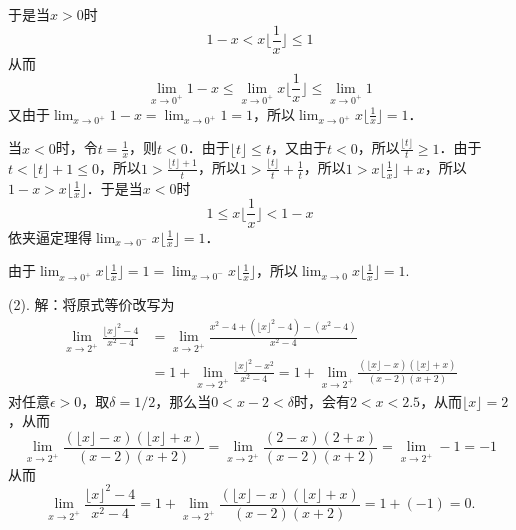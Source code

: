 于是当$x > 0$时
\begin{equation}
    1-x < x \bigg\lfloor \frac{1}{x} \bigg\rfloor \leq 1
\end{equation}
从而
\begin{equation}
    \lim_{x \to 0^+} 1 - x \leq \lim_{x \to 0^+} x \bigg\lfloor \frac{1}{x} \bigg\rfloor \leq \lim_{x \to 0^+} 1
\end{equation}
又由于$\displaystyle\lim_{x \to 0^+} 1-x = \displaystyle\lim_{x \to 0^+} 1 = 1$，所以$\displaystyle\lim_{x \to 0^+} x \bigg\lfloor \displaystyle\frac{1}{x} \bigg\rfloor = 1$．

当$x < 0$时，令$t = \displaystyle\frac{1}{x}$，则$t < 0$．由于$\lfloor t \rfloor \leq t$，又由于$t<0$，所以$\displaystyle\frac{\lfloor t \rfloor}{t} \geq 1$．由于$t < \lfloor t \rfloor + 1 \leq 0$，所以$1 > \displaystyle\frac{\lfloor t \rfloor + 1}{t}$，所以$1 > \displaystyle\frac{\lfloor t \rfloor}{t} + \displaystyle\frac{1}{t}$，所以$1 > x \bigg\lfloor \displaystyle\frac{1}{x} \bigg\rfloor + x$，所以$1-x > x \bigg\lfloor \displaystyle\frac{1}{x} \bigg\rfloor$．于是当$x < 0$时
\begin{equation}
    1 \leq x \bigg\lfloor \frac{1}{x} \bigg\rfloor < 1-x
\end{equation}
依夹逼定理得$\displaystyle\lim_{x \to 0^-} x \bigg\lfloor \displaystyle\frac{1}{x} \bigg\rfloor = 1$．

由于$\displaystyle\lim_{x \to 0^+} x \bigg\lfloor \displaystyle\frac{1}{x} \bigg\rfloor = 1 = \displaystyle\lim_{x \to 0^-} x \bigg\lfloor \displaystyle\frac{1}{x} \bigg\rfloor$，所以$\displaystyle\lim_{x \to 0} x \bigg\lfloor \displaystyle\frac{1}{x} \bigg\rfloor = 1$.

(2). 解：将原式等价改写为
\begin{align}
    \lim_{x \to 2^+} \frac{\lfloor x \rfloor^2 - 4}{x^2-4} &= \lim_{x \to 2^+} \frac{x^2-4 + (\lfloor x \rfloor^2 - 4) - (x^2 - 4)}{x^2 - 4} \\
    &= 1 + \lim_{x \to 2^+} \frac{\lfloor x \rfloor^2 - x^2}{x^2 - 4} = 1 + \lim_{x \to 2^+} \frac{(\lfloor x \rfloor - x)(\lfloor x \rfloor + x)}{(x-2)(x+2)}
\end{align}
对任意$\epsilon > 0$，取$\delta = 1/2$，那么当$0 < x - 2 < \delta$时，会有$2 < x < 2.5$，从而$\lfloor x \rfloor = 2$，从而
\begin{equation}
    \lim_{x \to 2^+} \frac{(\lfloor x \rfloor - x)(\lfloor x \rfloor + x)}{(x-2)(x+2)} = \lim_{x \to 2^+} \frac{(2-x)(2+x)}{(x-2)(x+2)} = \lim_{x \to 2^+} -1 = -1
\end{equation}
从而
\begin{equation}
    \lim_{x \to 2^+} \frac{\lfloor x \rfloor^2 - 4}{x^2-4} = 1 + \lim_{x \to 2^+} \frac{(\lfloor x \rfloor - x)(\lfloor x \rfloor + x)}{(x-2)(x+2)} = 1 + (-1) = 0.
\end{equation}

